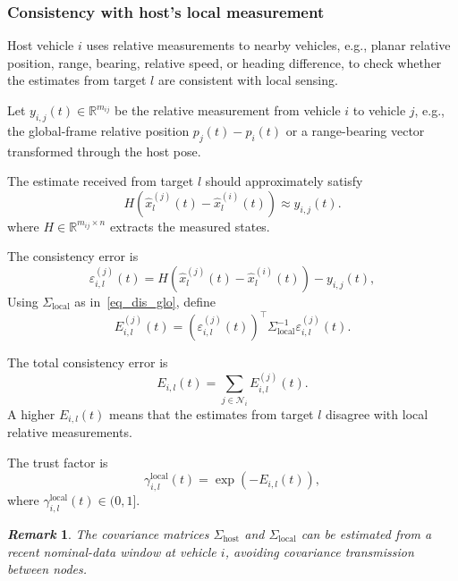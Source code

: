 \documentclass[journal,twoside]{IEEEtran}
\def\N{\mathcal{N}} %
\newtheorem{remark}{\it Remark}%
\begin{document}
\subsubsection{Consistency with host's local measurement}
Host vehicle $i$ uses relative measurements to nearby vehicles, e.g., planar relative position, range, bearing, relative speed, or heading difference, to check whether the estimates from target $l$ are consistent with local sensing.

Let $y_{i,j}(t) \in \mathbb{R}^{m_{ij}}$ be the relative measurement from vehicle $i$ to vehicle $j$, e.g., the global-frame relative position $p_j(t)-p_i(t)$ or a range-bearing vector transformed through the host pose.

The estimate received from target $l$ should approximately satisfy
\begin{equation*}
    H(\hat{x}_l^{(j)}(t) - \hat{x}_l^{(i)}(t)) \approx y_{i,j}(t).
\end{equation*}
where $H \in \mathbb{R}^{m_{ij} \times n}$ extracts the measured states.

The consistency error is
\begin{equation}
    \varepsilon_{i,l}^{(j)}(t) = H\left( \hat{x}_l^{(j)}(t) - \hat{x}_l^{(i)}(t) \right) - y_{i,j}(t),
\end{equation}
Using $\Sigma_{\text{local}}$ as in~\eqref{eq_dis_glo}, define
\begin{equation}
    E_{i,l}^{(j)}(t) = (\varepsilon_{i,l}^{(j)}(t))^{\top} \Sigma_{\text{local}}^{-1} \varepsilon_{i,l}^{(j)}(t).
\end{equation}

The total consistency error is
\begin{equation}
    E_{i,l}(t) = \sum_{j \in \N_i} E_{i,l}^{(j)}(t).
\end{equation}
A higher $E_{i,l}(t)$ means that the estimates from target $l$ disagree with local relative measurements.

The trust factor is
\begin{equation}
    \gamma_{i,l}^{\text{local}}(t) = \exp\left( -{E_{i,l}(t)} \right),
\end{equation}
where $\gamma_{i,l}^{\text{local}}(t) \in (0, 1]$.
\begin{remark}
The covariance matrices $\Sigma_{\text{host}}$ and $\Sigma_{\text{local}}$ can be estimated from a recent nominal-data window at vehicle \(i\), avoiding covariance transmission between nodes.
\end{remark}
\end{document}

